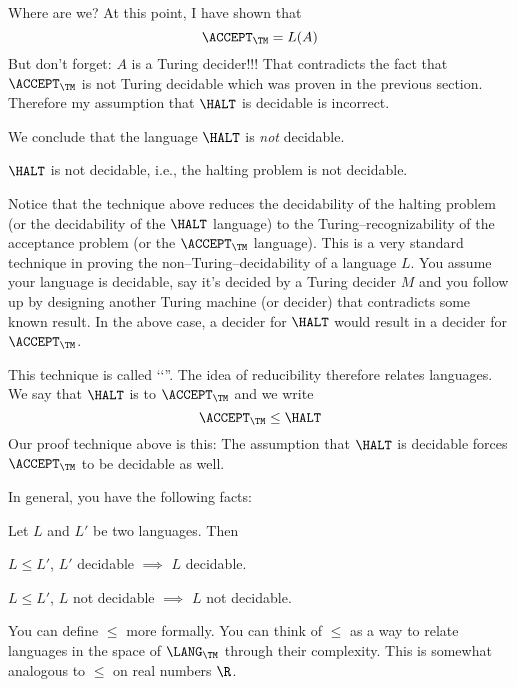 Where are we?
At this point, I have shown that
\[
\ACCEPT_\TM = L(A)
\]
But don't forget: $A$ is a Turing decider!!!
That contradicts the fact that $\ACCEPT_\TM$ is not Turing decidable
which was proven in the previous section.
Therefore my assumption that $\HALT$ is decidable is incorrect.

We conclude that the language
$\HALT$ is \textit{not} decidable.

\begin{thm}
$\HALT$ is not decidable, i.e., the halting problem is not decidable.
\end{thm}

Notice that the technique above reduces the decidability of 
the halting problem (or the decidability of the $\HALT$ language)
to the Turing--recognizability of the acceptance problem (or the
$\ACCEPT_\TM$ language).
This is a very standard technique in proving
the non--Turing--decidability of a 
language $L$.
You assume your language is decidable, say it's decided by a
Turing decider $M$ and you follow up by designing another Turing machine
(or decider) that contradicts some known result.
In the above case, a decider for $\HALT$ would result in a 
decider for $\ACCEPT_\TM$.

This technique is called \lq\lq {}''.
The idea of reducibility therefore relates languages.
We say that $\HALT$ is 
to $\ACCEPT_\TM$ and we write
\[
\ACCEPT_\TM \leq \HALT
\]
Our proof technique above is this:
The assumption that $\HALT$ is decidable forces $\ACCEPT_\TM$ to be
decidable as well.

In general, you have the following facts:

\begin{thm}
Let $L$ and $L'$ be two languages. Then
\begin{tightlist}
\item $L \leq L'$, $L'$ decidable $\implies$ $L$ decidable.
\item $L \leq L'$, $L$ not decidable $\implies$ $L$ not decidable.
\end{tightlist}
\end{thm}

You can define $\leq$ more formally.
You can think of $\leq$ as a way to relate
languages in the space of $\LANG_\TM$ through their complexity.
This is somewhat analogous to $\leq$ on real numbers $\R$. 
